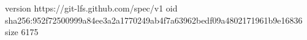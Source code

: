 version https://git-lfs.github.com/spec/v1
oid sha256:952f72500999a84ee3a2a1770249ab4f7a63962bedf09a4802171961b9e16836
size 6175
